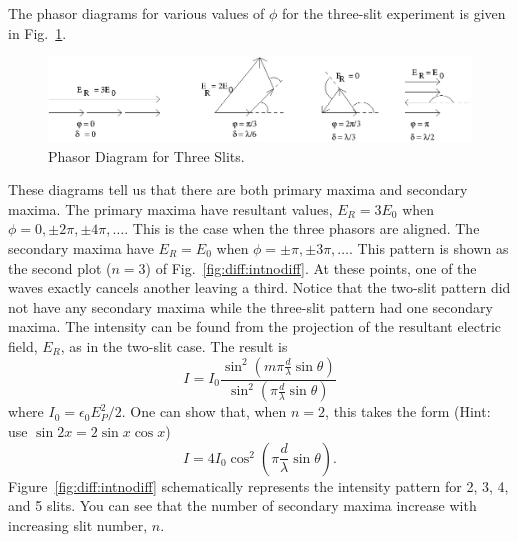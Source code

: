 The phasor diagrams for various values of $\phi$ for the three-slit experiment
is given in Fig.~\ref{fig:diff:phasors_3slit}.
\begin{figure}[htb]
\centering 
\epsfxsize=14cm \includegraphics[scale=0.6]{10_diffraction/phasors_3slit.eps}
\caption{Phasor Diagram for Three Slits.}
\label{fig:diff:phasors_3slit}
\end{figure}
These diagrams tell us that there are both primary maxima 
and secondary maxima.  The primary maxima have resultant values, $E_R = 3E_0$
when $\phi = 0, \pm2 \pi, \pm 4 \pi,\dots$.  This is the case when the three 
phasors are aligned.  The secondary maxima have $E_R = E_0$ when 
$\phi = \pm \pi, \pm 3\pi,\dots$.  This pattern is shown as the second plot 
($n=3$) of Fig.~\ref{fig:diff:intnodiff}.  At these points, one of the waves
exactly cancels another leaving a third.  Notice that the two-slit
pattern did not have any secondary maxima while the three-slit pattern had
one secondary maxima.  The intensity can be found from the projection
of the resultant electric field, $E_R$, as in the two-slit case.  The
result is
\begin{equation}
I   =  I_0 \frac{\sin^2 \left(m \pi \frac{d}{\lambda} \sin \theta\right)}
                 {\sin^2 \left(  \pi \frac{d}{\lambda} \sin \theta\right)}
\label{eqn:diff:multiI}
\end{equation}
where $I_0 = \epsilon_0 E_P^2/2$. One can show that, when $n=2$,
this takes the form (Hint: use $\sin 2x = 2 \sin x \cos x$)
$$I=4I_0\cos^2\left(\pi \frac{d}{\lambda} \sin \theta\right).$$
Figure~\ref{fig:diff:intnodiff} schematically represents
the intensity pattern for 2, 3, 4, and 5 slits.
You can see that the number of secondary maxima increase with increasing 
slit number, $n$.

